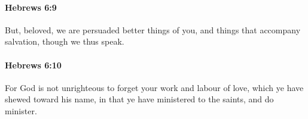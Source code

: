 		\paragraph{Hebrews 6:9} %
			\label{HEBREWS-6-9}

			But, beloved, we are persuaded better things of you, and things that accompany salvation, though we thus speak.

			\begin{framed}
			\scriptsize
				\begin{compactdesc}
					\item[SBLG] 
				\end{compactdesc}
			\end{framed}

		\paragraph{Hebrews 6:10} %
			\label{HEBREWS-6-10}

			For God is not unrighteous to forget your work and labour of love, which ye have shewed toward his name, in that ye have ministered to the saints, and do minister.

